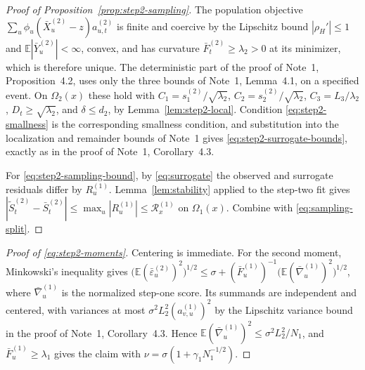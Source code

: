\documentclass[11pt]{article}
\newcommand{\E}{\mathbb{E}}
\newcommand{\Signal}{X}
\newcommand{\Data}{Y}
\newcommand{\IMFt}{\widetilde S}
\newcommand{\IMFb}{\bar S}
\newcommand{\IF}{F}
\theoremstyle{definition}
\begin{document}
\begin{proof}[Proof of Proposition~\ref{prop:step2-sampling}]
The population objective \(\sum_u\phi_u(\bar\Signal^{(2)}_u-z)a^{(2)}_{u,t}\)
is finite and coercive by the Lipschitz bound \(|\rho_H'|\leq1\) and
\(\E|\bar\Data^{(2)}_u|<\infty\), convex, and has curvature
\(\bar\IF^{(2)}_t\geq\lambda_2>0\) at its minimizer, which is therefore
unique.  The deterministic part of the proof of Note~1,
Proposition~4.2, uses only the three bounds of Note~1, Lemma~4.1, on a
specified event.  On \(\Omega_2(x)\) these hold with
\(C_1=s^{(2)}_1/\sqrt{\lambda_2}\), \(C_2=s^{(2)}_2/\sqrt{\lambda_2}\),
\(C_3=L_3/\lambda_2\), \(D_t\geq\sqrt{\lambda_2}\), and \(\delta\leq d_2\),
by Lemma~\ref{lem:step2-local}.  Condition \eqref{eq:step2-smallness} is
the corresponding smallness condition, and substitution into the
localization and remainder bounds of Note~1 gives
\eqref{eq:step2-surrogate-bounds}, exactly as in the proof of Note~1,
Corollary~4.3.

For \eqref{eq:step2-sampling-bound}, by \eqref{eq:surrogate} the observed
and surrogate residuals differ by \(R^{(1)}_u\).  Lemma~\ref{lem:stability}
applied to the step-two fit gives
\(|\IMFt^{(2)}_t-\IMFb^{(2)}_t|\leq\max_u|R^{(1)}_u|\leq\mathcal R^{(1)}_x\)
on \(\Omega_1(x)\).  Combine with \eqref{eq:sampling-split}.
\end{proof}

\begin{proof}[Proof of \eqref{eq:step2-moments}]
Centering is immediate.  For the second moment, Minkowski's inequality
gives
\(\bigl(\E(\bar\varepsilon^{(2)}_u)^2\bigr)^{1/2}
 \leq\sigma+(\bar\IF^{(1)}_u)^{-1}\bigl(\E(\bar\nabla^{(1)}_u)^2\bigr)^{1/2}\),
where \(\bar\nabla^{(1)}_u\) is the normalized step-one score.  Its
summands are independent and centered, with variances at most
\(\sigma^2L_2^2(a^{(1)}_{v,u})^2\) by the Lipschitz variance bound in the
proof of Note~1, Corollary~4.3.  Hence
\(\E(\bar\nabla^{(1)}_u)^2\leq\sigma^2L_2^2/N_1\), and
\(\bar\IF^{(1)}_u\geq\lambda_1\) gives the claim with
\(\nu=\sigma(1+\gamma_1N_1^{-1/2})\).
\end{proof}
\end{document}
